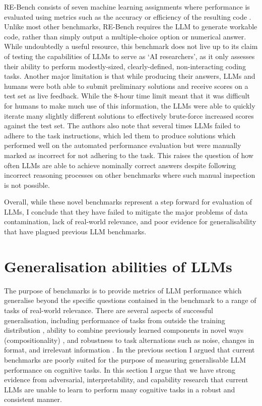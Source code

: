 \documentclass{article}
\begin{document}
RE-Bench consists of seven machine learning assignments where performance is evaluated using metrics such as the accuracy or efficiency of the resulting code \citep{wijk2024re}. Unlike most other benchmarks, RE-Bench requires the LLM to generate workable code, rather than simply output a multiple-choice option or numerical answer. While undoubtedly a useful resource, this benchmark does not live up to its claim of testing the capabilities of LLMs to serve as `AI researchers', as it only assesses their ability to perform modestly-sized, clearly-defined, non-interacting coding tasks. Another major limitation is that while producing their answers, LLMs and humans were both able to submit preliminary solutions and receive scores on a test set as live feedback. While the 8-hour time limit meant that it was difficult for humans to make much use of this information, the LLMs were able to quickly iterate many slightly different solutions to effectively brute-force increased scores against the test set. The authors also note that several times LLMs failed to adhere to the task instructions, which led them to produce solutions which performed well on the automated performance evaluation but were manually marked as incorrect for not adhering to the task. This raises the question of how often LLMs are able to achieve nominally correct answers despite following incorrect reasoning processes on other benchmarks where such manual inspection is not possible.

Overall, while these novel benchmarks represent a step forward for evaluation of LLMs, I conclude that they have failed to mitigate the major problems of data contamination, lack of real-world relevance, and poor evidence for generalisability that have plagued previous LLM benchmarks.

\section{Generalisation abilities of LLMs}

The purpose of benchmarks is to provide metrics of LLM performance which generalise beyond the specific questions contained in the benchmark to a range of tasks of real-world relevance. There are several aspects of successful generalisation, including performance of tasks from outside the training distribution \citep{zhang2023paradox}, ability to combine previously learned components in novel ways (compositionality) \citep{yao2022structural}, and robustness to task alternations such as noise, changes in format, and irrelevant information \citep{ullman2023large}. In the previous section I argued that current benchmarks are poorly suited for the purpose of measuring generalisable LLM performance on cognitive tasks. In this section I argue that we have strong evidence from adversarial, interpretability, and capability research that current LLMs are unable to learn to perform many cognitive tasks in a robust and consistent manner. 
\end{document}
